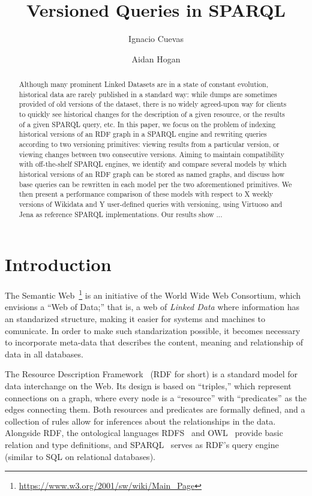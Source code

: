 \documentclass{llncs}
\begin{document}
\title{Versioned Queries in SPARQL}
\author{Ignacio Cuevas \and Aidan Hogan}


\maketitle

\begin{abstract}
Although many prominent Linked Datasets are in a state of constant evolution, historical data are rarely published in a standard way: while dumps are sometimes provided of old versions of the dataset, there is no widely agreed-upon way for clients to quickly see historical changes for the description of a given resource,  or the results of a given SPARQL query, etc. In this paper, we focus on the problem of indexing historical versions of an RDF graph in a SPARQL engine and rewriting queries according to two versioning primitives: viewing results from a particular version, or viewing changes between two consecutive versions. Aiming to maintain compatibility with off-the-shelf SPARQL engines, we identify and compare several models by which historical versions of an RDF graph can be stored as named graphs, and discuss how base queries can be rewritten in each model per the two aforementioned primitives. We then present a performance comparison of these models with respect to X weekly versions of Wikidata and Y user-defined queries with versioning, using Virtuoso and Jena as reference SPARQL implementations. Our results show ...
\end{abstract}


\section{Introduction}
The Semantic Web~\footnote{\url{https://www.w3.org/2001/sw/wiki/Main_Page}} is an initiative of the World Wide Web Consortium, which envisions a ``Web of Data;'' that is, a web of \textit{Linked Data} where information has an standarized structure, making it easier for systems and machines to comunicate. In order to make such standarization possible, it becomes necessary to incorporate meta-data that describes the content, meaning and relationship of data in all databases.


The Resource Description Framework~\cite{key:rdfprimer11} (RDF for short) is a standard model for data interchange on the Web. Its design is based on ``triples,'' which represent connections on a graph, where every node is a ``resource'' with ``predicates'' as the edges connecting them. Both resources and predicates are formally defined, and a collection of rules allow for inferences about the relationships in the data.
Alongside RDF, the ontological languages RDFS~\cite{key:rdfschema11} and OWL~\cite{key:owl2primer} provide basic relation and type definitions, and SPARQL~\cite{key:sparql11} serves as RDF's query engine (similar to SQL on relational databases).
\end{document}
